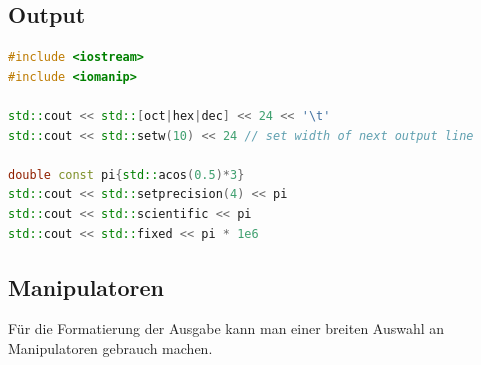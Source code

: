 \subsection{Output}
\begin{lstlisting}[language=C++, caption=Formatting Output]
#include <iostream>
#include <iomanip>

std::cout << std::[oct|hex|dec] << 24 << '\t'
std::cout << std::setw(10) << 24 // set width of next output line

double const pi{std::acos(0.5)*3}
std::cout << std::setprecision(4) << pi
std::cout << std::scientific << pi
std::cout << std::fixed << pi * 1e6
\end{lstlisting}


\clearpage

\subsection{Manipulatoren}
Für die Formatierung der Ausgabe kann man einer breiten Auswahl an Manipulatoren gebrauch machen.
